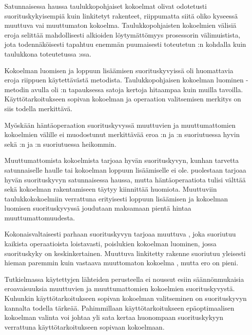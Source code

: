 Satunnaisessa haussa taulukkopohjaiset kokoelmat olivat odotetusti suorituskykyisempiä kuin linkitetyt rakenteet, riippumatta siitä oliko kyseessä muuttuva vai muuttumaton kokoelma. Taulukkopohjaisten kokoelmien välisiä eroja selittää mahdollisesti alkioiden löytymättömyys prosessorin välimuistista, jota todennäköisesti tapahtuu enemmän puumaisesti toteutetun :n kohdalla kuin taulukkona toteutetussa :ssa.

Kokoelman luomisen ja loppuun lisäämisen suorituskyvyissä oli huomattavia eroja riippuen käytettävästä metodista. Taulukkopohjaisen kokoelman luominen \code{:+}-metodin avulla oli :n tapauksessa satoja kertoja hitaampaa kuin muilla tavoilla. Käyttötarkoitukseen sopivan kokoelman ja operaation valitsemisen merkitys on siis todella merkittävä.

Myöskään häntäoperaation suorituskyvyssä muuttuvien ja muuttumattomien kokoelmien välille ei muodostunut merkittävää eroa :n ja :n suoriutuessa hyvin sekä :n ja :n suoriutuessa heikommin. 

Muuttumattomista kokoelmista  tarjoaa hyvän suorituskyvyn, kunhan tarvetta satunnaiselle haulle tai kokoelman loppuun lisäämiselle ei ole.  puolestaan tarjoaa hyvän suorituskyvyn satunnaisessa haussa, mutta häntäoperaatiota tulisi välttää sekä kokoelman rakentamiseen täytyy kiinnittää huomiota. Muuttuviin taulukkokokoelmiin verrattuna erityisesti loppuun lisäämisen ja kokoelman luomisen suorituskyvyssä joudutaan maksamaan pientä hintaa muuttumattomuudesta.

Kokonaisvaltaisesti parhaan suorituskyvyn tarjoaa muuttuva , joka suoriutuu kaikista operaatioista loistavasti, poislukien kokoelman luominen, jossa suorituskyky on keskinkertainen. Muuttuva linkitetty rakenne  suoriutuu yleisesti hieman paremmin kuin vastaava muuttomaton kokoelma , mutta ero on pieni.

Tutkielmassa käytettyjen lähteiden perusteella ei noussut esiin säännönmukaisia eroavaisuuksia muuttuvien ja muuttumattomien kokoelmien suorituskyvystä. Kuhunkin käyttötarkoitukseen sopivan kokoelman valitseminen on suorituskyvyn kannalta todella tärkeää. Pahimmillaan käyttötarkoitukseen epäoptimaalisen kokoelman valinta voi johtaa yli sata kertaa huonompaan suorituskykyyn verrattuna käyttötarkoitukseen sopivaan kokoelmaan.
